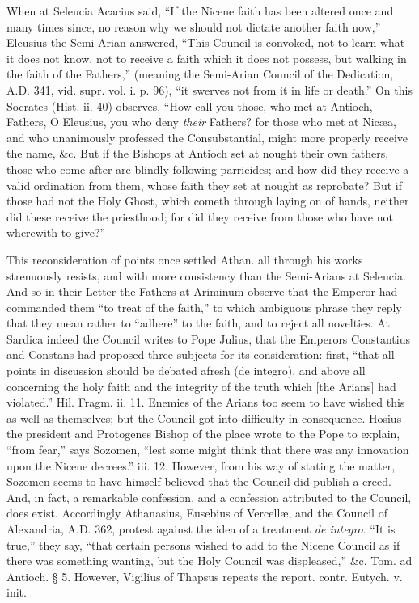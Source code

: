 When at Seleucia Acacius said, ``If the Nicene
faith has been altered once and many times since, no reason why we
should not dictate another faith now,'' Eleusius the Semi-Arian
answered, ``This Council is convoked, not to learn what it does not
know, not to receive a faith which it does not possess, but walking in
the faith of the Fathers,'' (meaning the Semi-Arian Council of the
Dedication, A.D.
341, vid. supr. vol. i. p. 96), ``it swerves not from it in life or
death.'' On this Socrates (Hist. ii. 40) observes, ``How call you those,
who met at Antioch, Fathers, O Eleusius, you who deny \emph{their} Fathers? for those who met at Nicæa, and who unanimously
professed the Consubstantial, might more properly receive the name,
\&c. But if the Bishops at Antioch set at nought their own fathers,
those who come after are blindly following parricides; and how did
they receive a valid ordination from them, whose faith they set at
nought as reprobate? But if those had not the Holy Ghost, which cometh
through laying on of hands, neither did these receive the priesthood;
for did they receive from those who have not wherewith to give?''

This reconsideration of points once settled Athan.
all through his works strenuously resists, and with more consistency
than the Semi-Arians at Seleucia. And so in their Letter the Fathers
at Ariminum observe that the Emperor had commanded them ``to treat of
the faith,'' to which ambiguous phrase they reply that they mean rather
to ``adhere'' to the faith, and to reject all novelties. At Sardica
indeed the Council writes to Pope Julius, that the Emperors
Constantius and Constans had proposed three subjects for its
consideration: first, ``that all points in discussion should be debated
afresh (de integro), and above all concerning the holy faith and the
integrity of the truth which [the Arians] had violated.'' Hil. Fragm.
ii. 11. Enemies of the Arians too seem to have wished this as well as
themselves; but the Council got into difficulty in consequence. Hosius
the president and Protogenes Bishop of the place wrote to the Pope to
explain, ``from fear,'' says Sozomen, ``lest some might think that there
was any innovation upon the Nicene decrees.'' iii. 12. However,
from his way of stating the matter, Sozomen seems to have himself
believed that the Council did publish a creed. And, in fact, a
remarkable confession, and a confession attributed to the Council,
does exist. Accordingly Athanasius, Eusebius of Vercellæ, and the
Council of Alexandria, A.D.
362, protest against the idea of a treatment \emph{de integro}. ``It is true,'' they say, ``that certain persons wished to add to
the Nicene Council as if there was something wanting, but the Holy
Council was displeased,'' \&c. Tom. ad Antioch. § 5. However,
Vigilius of Thapsus repeats the report. contr. Eutych. v. init.

